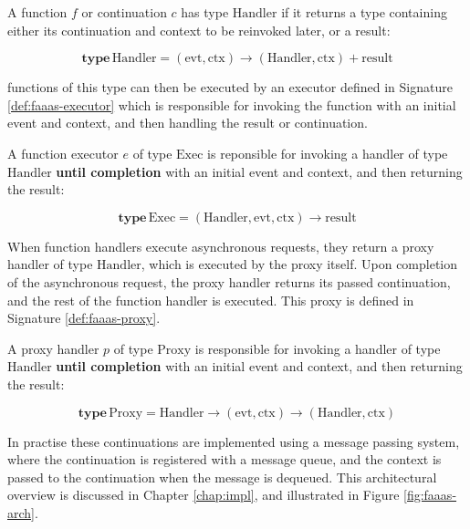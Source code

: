\begin{signature}
\label{def:faaas-continuation-signature}
A function $f$ or continuation $c$ has type $\textrm{Handler}$ if it returns a type containing either its continuation and context to be reinvoked later, or a result:

$$\textbf{type}\, \textrm{Handler} = (\textrm{evt}, \textrm{ctx}) \rightarrow (\textrm{Handler}, \textrm{ctx}) + \textrm{result}$$
\end{signature}

\faas{} functions of this type can then be executed by an executor defined in Signature \ref{def:faaas-executor} which is responsible for invoking the function with an initial event and context, and then handling the result or continuation.

\begin{signature}
\label{def:faaas-executor}
A function executor $e$ of type $\textrm{Exec}$ is reponsible for invoking a \faaas{} handler of type $\textrm{Handler}$ \textbf{until completion} with an initial event and context, and then returning the result:

$$\textbf{type}\, \textrm{Exec} = (\textrm{Handler}, \textrm{evt}, \textrm{ctx}) \rightarrow \textrm{result}$$
\end{signature}

When function handlers execute asynchronous requests, they return a proxy handler of type $\textrm{Handler}$, which is executed by the proxy itself. Upon completion of the asynchronous request, the proxy handler returns its passed continuation, and the rest of the function handler is executed. This proxy is defined in Signature \ref{def:faaas-proxy}.

\begin{signature}
\label{def:faaas-proxy}
A proxy handler $p$ of type $\textrm{Proxy}$ is responsible for invoking a \faas{} handler of type $\textrm{Handler}$ \textbf{until completion} with an initial event and context, and then returning the result:

$$\textbf{type}\, \textrm{Proxy} = \textrm{Handler} \rightarrow (\textrm{evt}, \textrm{ctx}) \rightarrow (\textrm{Handler}, \textrm{ctx})$$
\end{signature}

In practise these continuations are implemented using a message passing system, where the continuation is registered with a message queue, and the context is passed to the continuation when the message is dequeued. This architectural overview is discussed in Chapter \ref{chap:impl}, and illustrated in Figure \ref{fig:faaas-arch}.


